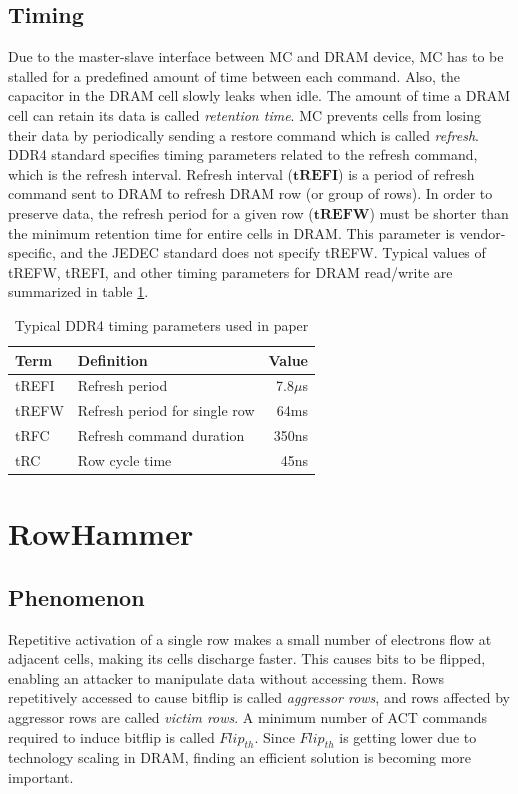 \subsection{Timing}
Due to the master-slave interface between MC and DRAM device, MC has to be stalled for a predefined amount of time between each
command. Also, the capacitor in the DRAM cell slowly leaks when idle. The amount of time a DRAM cell can retain its
data is called \textit{retention time}. MC prevents cells from losing their data by periodically sending a restore
command which is called \textit{refresh}. DDR4 standard \cite{JEDEC_DDR4} specifies timing parameters related to the refresh command,
which is the refresh interval. Refresh interval ($\mathbf{tREFI}$) is a period of refresh command sent to DRAM to refresh DRAM row 
(or group of rows). In order to preserve data, the refresh period for a given row ($\mathbf{tREFW}$) must be shorter than the minimum retention time for entire cells in DRAM. This parameter is vendor-specific, and the JEDEC standard does not specify tREFW. 
Typical values of tREFW, tREFI, and other timing parameters for DRAM read/write are summarized in table \ref{tab:DDR4_timing}.

\begin{table}[t]
  \centering
  \caption{Typical DDR4 timing parameters used in paper}
  \label{tab:DDR4_timing}
  \begin{tabular}{llr}
  \toprule
    Term  &  Definition & Value \\
  \midrule 
    tREFI & Refresh period & 7.8$\mu$s \\ 
    tREFW & Refresh period for single row & 64ms \\
    tRFC & Refresh command duration & 350ns  \\ 
    tRC & Row cycle time & 45ns  \\
  \bottomrule
  \end{tabular}
  \vspace{-0.20in}
\end{table}

\section{RowHammer}
\subsection{Phenomenon}
Repetitive activation of a single row makes a small number of electrons flow at adjacent cells, making its cells discharge faster. 
This causes bits to be flipped, enabling an attacker to manipulate data without accessing them. Rows repetitively accessed
to cause bitflip is called \textit{aggressor rows}, and rows affected by aggressor rows are called \textit{victim rows}. 
A minimum number of ACT commands required to induce bitflip is called $Flip_{th}$. 
Since $Flip_{th}$ is getting lower due to technology scaling in DRAM, finding an efficient solution is becoming more important.

